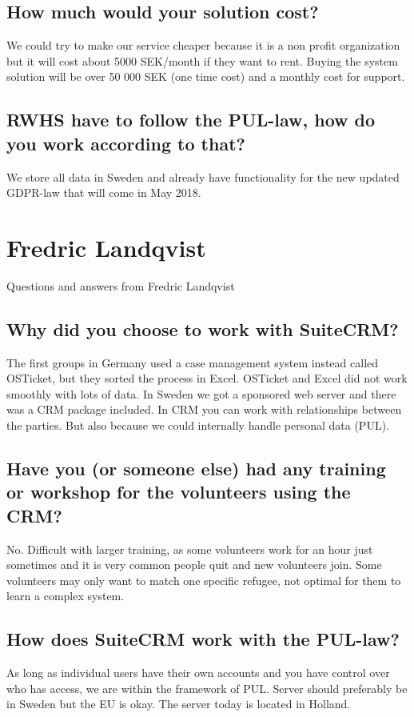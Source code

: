 \subsection{How much would your solution cost?}
We could try to make our service cheaper because it is a non profit organization but it will cost about 5000 SEK/month if they want to rent. Buying the system solution will be over 50 000 SEK (one time cost) and a monthly cost for support. 

\subsection{RWHS have to follow the PUL-law, how do you work according to that?}
We store all data in Sweden and already have functionality for the new updated GDPR-law that will come in May 2018. 

\section{Fredric Landqvist}
\label{app:fredric-landqvist}
Questions and answers from Fredric Landqvist

\subsection{Why did you choose to work with SuiteCRM?}
The first groups in Germany used a case management system instead called OSTicket, but they sorted the process in Excel. OSTicket and Excel did not work smoothly with lots of data. In Sweden we got a sponsored web server and there was a CRM package included. In CRM you can work with relationships between the parties. But also because we could internally handle personal data (PUL).

\subsection{Have you (or someone else) had any training or workshop for the volunteers using the CRM?}
No. Difficult with larger training, as some volunteers work for an hour just sometimes and it is very common people quit and new volunteers join. Some volunteers may only want to match one specific refugee, not optimal for them to learn a complex system.

\subsection{How does SuiteCRM work with the PUL-law?}
As long as individual users have their own accounts and you have control over who has access, we are within the framework of PUL. Server should preferably be in Sweden but the EU is okay. The server today is located in Holland.

